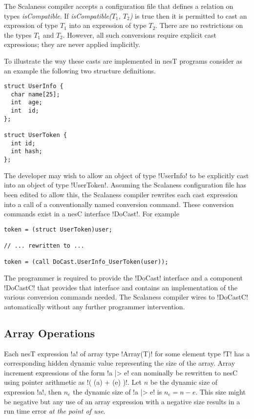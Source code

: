 The Scalaness compiler accepts a configuration file that defines a relation on types
\textit{isCompatible}. If \textit{isCompatible($T_1$, $T_2$)} is true then it is permitted to
cast an expression of type $T_1$ into an expression of type $T_2$. There are no restrictions on
the types $T_1$ and $T_2$. However, all such conversions require explicit cast expressions; they
are never applied implicitly.

To illustrate the way these casts are implemented in nesT programs consider as an example the
following two structure definitions.

\singlespace
\begin{lstlisting}[language=nesC]
struct UserInfo {
  char name[25];
  int  age;
  int  id;
};

struct UserToken {
  int id;
  int hash;
};
\end{lstlisting}
\primaryspacing

The developer may wish to allow an object of type !UserInfo! to be explicitly cast into an
object of type !UserToken!. Assuming the Scalaness configuration file has been edited to allow
this, the Scalaness compiler rewrites each cast expression into a call of a conventionally named
conversion command. These conversion commands exist in a nesC interface !DoCast!. For example

\singlespace
\begin{lstlisting}[language=nesC]
token = (struct UserToken)user;

// ... rewritten to ...

token = (call DoCast.UserInfo_UserToken(user));
\end{lstlisting}
\primaryspacing

The programmer is required to provide the !DoCast! interface and a component !DoCastC! that
provides that interface and contains an implementation of the various conversion commands
needed. The Scalaness compiler wires to !DoCastC! automatically without any further programmer
intervention.


\subsection{Array Operations}
\label{section-array-operations}

Each nesT expression !a! of array type !Array(T)! for some element type !T! has a corresponding
hidden dynamic value representing the size of the array. Array increment expressions of the form
!a |> e! can nominally be rewritten to nesC using pointer arithmetic as !( (a) + (e) )!. Let $n$
be the dynamic size of expression !a!, then $n_e$ the dynamic size of !a |> e! is $n_e = n - e$.
This size might be negative but any use of an array expression with a negative size results in a
run time error \emph{at the point of use}.


